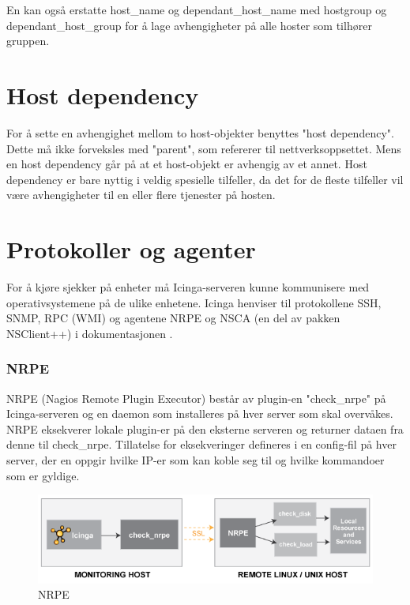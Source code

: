En kan også erstatte host\_name og dependant\_host\_name med hostgroup og dependant\_host\_group for å lage avhengigheter på alle hoster som tilhører gruppen.

\section{Host dependency}

For å sette en avhengighet mellom to host-objekter benyttes "host dependency". Dette må ikke forveksles med "parent", som refererer til nettverksoppsettet. Mens en host dependency går på at et host-objekt er avhengig av et annet. Host dependency er bare nyttig i veldig spesielle tilfeller, da det for de fleste tilfeller vil være avhengigheter til en eller flere tjenester på hosten\cite{hostandservicedep}.

\section{Protokoller og agenter}
For å kjøre sjekker på enheter må Icinga-serveren kunne kommunisere med operativsystemene på de ulike enhetene. Icinga henviser til protokollene SSH, SNMP, RPC (WMI) og agentene NRPE og NSCA (en del av pakken NSClient++) i dokumentasjonen\cite{icingaintegration} \cite{icingaadditionalsoftware}. 

\subsubsection{NRPE}
NRPE (Nagios Remote Plugin Executor) består av plugin-en "check\_nrpe" på Icinga-serveren og en daemon som installeres på hver server som skal overvåkes. NRPE eksekverer lokale plugin-er på den eksterne serveren og returner dataen fra denne til check\_nrpe. Tillatelse for eksekveringer defineres i en config-fil på hver server, der en oppgir hvilke IP-er som kan koble seg til og hvilke kommandoer som er gyldige. 

\begin{figure}[H]
    \centering
    \includegraphics[scale=0.6]{img/nrpe.png}
    \caption{NRPE}
    \label{nrpe}
\end{figure}

